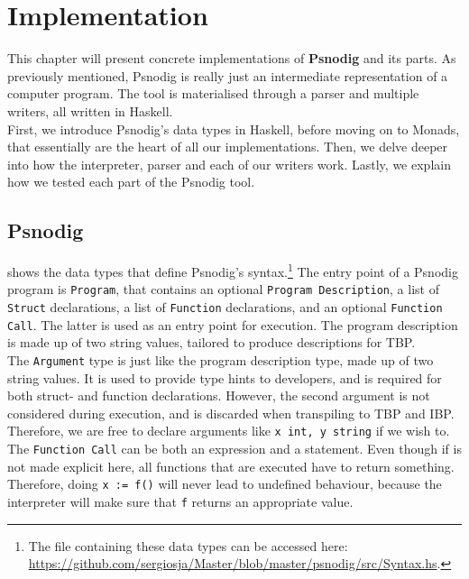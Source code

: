 \chapter{Implementation}

This chapter will present concrete implementations of \textbf{Psnodig} and its parts. As previously mentioned, Psnodig is really just an intermediate representation of a computer program. The tool is materialised through a parser and multiple writers, all written in Haskell. \\

First, we introduce Psnodig's data types in Haskell, before moving on to Monads, that essentially are the heart of all our implementations. Then, we delve deeper into how the interpreter, parser and each of our writers work. Lastly, we explain how we tested each part of the Psnodig tool.

\section{Psnodig}

 shows the data types that define Psnodig's syntax.\footnote{The file containing these data types can be accessed here: \url{https://github.com/sergiosja/Master/blob/master/psnodig/src/Syntax.hs}.} The entry point of a Psnodig program is \texttt{Program}, that contains an optional \texttt{Program Description}, a list of \texttt{Struct} declarations, a list of \texttt{Function} declarations, and an optional \texttt{Function Call}. The latter is used as an entry point for execution. The program description is made up of two string values, tailored to produce descriptions for TBP. \\

The \texttt{Argument} type is just like the program description type, made up of two string values. It is used to provide type hints to developers, and is required for both struct- and function declarations. However, the second argument is not considered during execution, and is discarded when transpiling to TBP and IBP. Therefore, we are free to declare arguments like \texttt{x int, y string} if we wish to. \\

The \texttt{Function Call} can be both an expression and a statement. Even though if is not made explicit here, all functions that are executed have to return something. Therefore, doing \texttt{x := f()} will never lead to undefined behaviour, because the interpreter will make sure that \texttt{f} returns an appropriate value. \\

